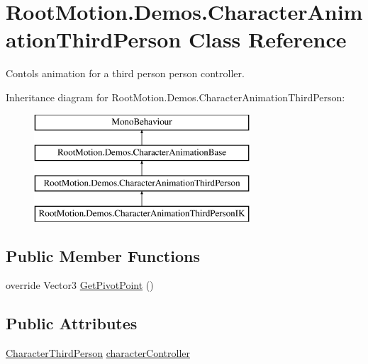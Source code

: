 \hypertarget{class_root_motion_1_1_demos_1_1_character_animation_third_person}{}\section{Root\+Motion.\+Demos.\+Character\+Animation\+Third\+Person Class Reference}
\label{class_root_motion_1_1_demos_1_1_character_animation_third_person}


Contols animation for a third person person controller.  


Inheritance diagram for Root\+Motion.\+Demos.\+Character\+Animation\+Third\+Person\+:\begin{figure}[H]
\begin{center}
\leavevmode
\includegraphics[height=4.000000cm]{class_root_motion_1_1_demos_1_1_character_animation_third_person}
\end{center}
\end{figure}
\subsection*{Public Member Functions}
\begin{DoxyCompactItemize}
\item 
override Vector3 \mbox{\hyperlink{class_root_motion_1_1_demos_1_1_character_animation_third_person_afb93b73712ca23aafeb4f50f38d68069}{Get\+Pivot\+Point}} ()
\end{DoxyCompactItemize}
\subsection*{Public Attributes}
\begin{DoxyCompactItemize}
\item 
\mbox{\hyperlink{class_root_motion_1_1_demos_1_1_character_third_person}{Character\+Third\+Person}} \mbox{\hyperlink{class_root_motion_1_1_demos_1_1_character_animation_third_person_a022c27708b7bd63268cb84f1bba1c592}{character\+Controller}}
\end{DoxyCompactItemize}
